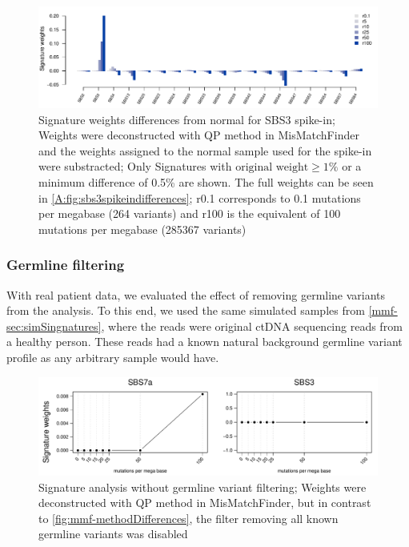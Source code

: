 \begin{figure}[ht]
\centering
\includegraphics[width=.99\linewidth]{Figures/MisMatchFinder/SBS3SpikeInSignatureDifferencesFocussed.pdf}
\caption[Signature weights differences from normal for SBS3 spike-in]{Signature weights differences from normal for SBS3 spike-in; Weights were deconstructed with QP method in MisMatchFinder and the weights assigned to the normal sample used for the spike-in were substracted; Only Signatures with $\text{original weight}\geq 1\%$ or a minimum difference of 0.5\% are shown. The full weights can be seen in \protect\autoref{A:fig:sbs3spikeindifferences}; r0.1 corresponds to 0.1 mutations per megabase (264 variants) and r100 is the equivalent of 100 mutations per megabase (285367 variants)}\label{fig:mmf-spikeSBS3signatures}
\end{figure}

\subsubsection{Germline filtering}
\label{mmf-sec:germlinefiltering}
With real patient data, we evaluated the effect of removing germline variants from the analysis. To this end, we used the same simulated samples from \autoref{mmf-sec:simSingnatures}, where the reads were original ctDNA sequencing reads from a healthy person. These reads had a known natural background germline variant profile as any arbitrary sample would have.

\begin{figure}[ht]
\centering
\includegraphics[width=.99\linewidth]{Figures/MisMatchFinder/noGermlineFilterAnalysis.pdf}
\caption[Signature analysis without germline variant filtering]{Signature analysis without germline variant filtering; Weights were deconstructed with QP method in MisMatchFinder, but in contrast to \protect\autoref{fig:mmf-methodDifferences}, the filter removing all known germline variants was disabled}\label{fig:mmf-noGermlineFilterAnalysis}
\end{figure}

